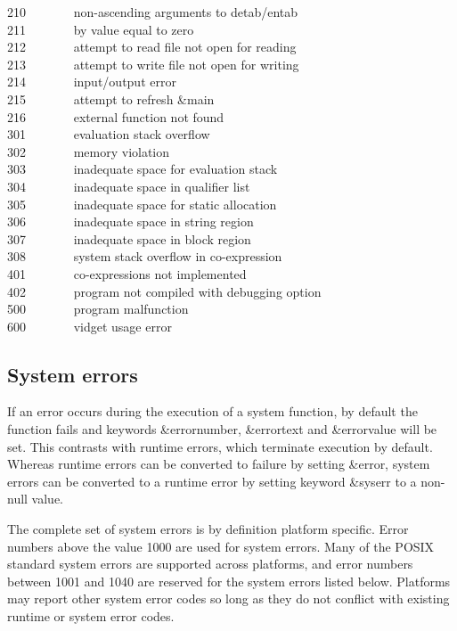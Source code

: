 210 \ \ \ \ \ \ \ non-ascending arguments to detab/entab\\
211 \ \ \ \ \ \ \ by value equal to zero\\
212 \ \ \ \ \ \ \ attempt to read file not open for reading\\
213 \ \ \ \ \ \ \ attempt to write file not open for writing\\
214 \ \ \ \ \ \ \ input/output error\\
215 \ \ \ \ \ \ \ attempt to refresh \&main\\
216 \ \ \ \ \ \ \ external function not found\\
301 \ \ \ \ \ \ \ evaluation stack overflow\\
302 \ \ \ \ \ \ \ memory violation\\
303 \ \ \ \ \ \ \ inadequate space for evaluation stack\\
304 \ \ \ \ \ \ \ inadequate space in qualifier list\\
305 \ \ \ \ \ \ \ inadequate space for static allocation\\
306 \ \ \ \ \ \ \ inadequate space in string region\\
307 \ \ \ \ \ \ \ inadequate space in block region\\
308 \ \ \ \ \ \ \ system stack overflow in co-expression\\
401 \ \ \ \ \ \ \ co-expressions not implemented\\
402 \ \ \ \ \ \ \ program not compiled with debugging option\\
500 \ \ \ \ \ \ \ program malfunction\\
600 \ \ \ \ \ \ \ vidget usage error

\subsection*{System errors}

If an error occurs during the execution of a system
function, by default the function fails and keywords \&errornumber, \&errortext
and \&errorvalue will be set. This contrasts with runtime errors, which
terminate execution by default. Whereas runtime errors can be converted to
failure by setting \&error, system errors can be converted to a runtime error by
setting keyword \&syserr to a non-null value.

The complete set of system errors is by definition platform
specific. Error numbers above the value 1000 are used for system errors. Many of
the POSIX standard system errors are supported across platforms, and error
numbers between 1001 and 1040 are reserved for the system errors listed
below. Platforms may report other system error codes so long as they do not
conflict with existing runtime or system error codes.

